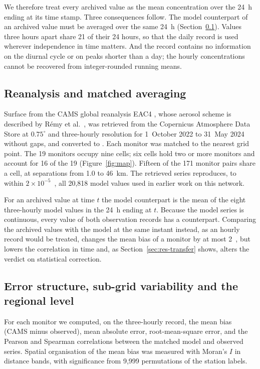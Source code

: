 We therefore treat every archived value as the mean concentration over the 24~h ending at its
time stamp. Three consequences follow. The model counterpart of an archived value must be averaged
over the same 24~h (Section~\ref{sec:cams}). Values three hours apart share 21 of their 24 hours,
so that the daily record is used wherever independence in time matters. And the record contains
no information on the diurnal cycle or on peaks shorter than a day; the hourly concentrations
cannot be recovered from integer-rounded running means.

\subsection{Reanalysis and matched averaging}
\label{sec:cams}

Surface \pmten{} from the CAMS global reanalysis EAC4 \citep{inness2019}, whose aerosol scheme is
described by R\'emy et al.~\citep{remy2019}, was retrieved from the Copernicus Atmosphere Data Store at
$0.75^{\circ}$ and three-hourly resolution for 1~October 2022 to 31~May 2024 without gaps, and
converted to \ugm{}. Each monitor was matched to the nearest grid point. The 19 monitors occupy
nine cells; six cells hold two or more monitors and account for 16 of the 19
(Figure~\ref{fig:map}). Fifteen of the 171 monitor pairs share a cell, at separations from 1.0 to
46~km. The retrieved series reproduces, to within $2\times10^{-5}$~\ugm{}, all 20,818 model values
used in earlier work on this network.

For an archived value at time $t$ the model counterpart is the mean of the eight three-hourly
model values in the 24~h ending at $t$. Because the model series is continuous, every value of
both observation records has a counterpart. Comparing the archived values with the model at the
same instant instead, as an hourly record would be treated, changes the mean bias of a monitor by
at most 2~\ugm{}, but lowers the correlation in time and, as Section~\ref{sec:res-transfer}
shows, alters the verdict on statistical correction.

\subsection{Error structure, sub-grid variability and the regional level}

For each monitor we computed, on the three-hourly record, the mean bias (CAMS minus observed),
mean absolute error, root-mean-square error, and the Pearson and Spearman correlations between
the matched model and observed series. Spatial organisation of the mean bias was measured with
Moran's $I$ \citep{moran1950} in distance bands, with significance from 9,999 permutations of the station labels.

